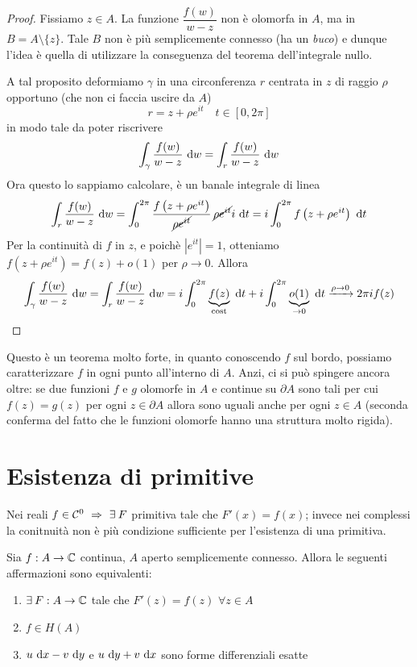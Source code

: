 \begin{proof}
Fissiamo $z\in A$. La funzione $\dfrac{f(w)}{w - z}$ non è olomorfa in $A$, ma in $B=A\setminus\{z\}$. Tale $B$ non è più semplicemente connesso (ha un \textit{buco}) e dunque l'idea è quella di utilizzare la conseguenza del teorema dell'integrale nullo.

A tal proposito deformiamo $\gamma$ in una circonferenza $r$ centrata in $z$ di raggio $\rho$ opportuno (che non ci faccia uscire da $A$)
$$
r=z+\rho e^{it} \quad t\in[0,2\pi]
$$
in modo tale da poter riscrivere
\begin{equation*}
\int_{\gamma}\frac{f(w)}{w - z} \  \mathrm{d} w=\int_{r}\frac{f(w)}{w - z} \  \mathrm{d} w
\end{equation*}
Ora questo lo sappiamo calcolare, è un banale integrale di linea
\begin{equation*}
\int_{r}\frac{f(w)}{w - z} \  \mathrm{d} w = \int^{2\pi}_{0}\frac{f\left(z + \rho e^{it}\right)}{\cancel{\rho e^{it}}}\,\cancel{\rho e^{it}}i \  \mathrm{d} t = i\int^{2\pi}_{0} f\left(z + \rho e^{it}\right) \  \mathrm{d} t
\end{equation*}
Per la continuità di $f$ in $z$, e poichè $\left|e^{it}\right|=1$, otteniamo $f\left(z + \rho e^{it}\right)=f(z)+o(1)$ per $\rho\to 0$. Allora
\begin{equation*}
\int_{\gamma}\frac{f(w)}{w - z} \  \mathrm{d} w=\int_{r}\frac{f(w)}{w - z} \  \mathrm{d} w=i\int_{0}^{2\pi} \underbrace{f(z)}_{\text{cost}}\  \mathrm{d} t+i\int_0^{2\pi} \underbrace{o(1)}_{\to 0}\  \mathrm{d} t \xrightarrow[]{\rho\to 0} 2\pi i f(z)
\end{equation*}
\end{proof}

Questo è un teorema molto forte, in quanto conoscendo $f$ sul bordo, possiamo caratterizzare $f$ in ogni punto all'interno di $A$. Anzi, ci si può spingere ancora oltre: se due funzioni $f$ e $g$ olomorfe in $A$ e continue su $\partial A$ sono tali per cui $f(z)=g(z)$ per ogni $z\in\partial A$ allora sono uguali anche per ogni $z\in A$ (seconda conferma del fatto che le funzioni olomorfe hanno una struttura molto rigida).

\section{Esistenza di primitive}

Nei reali $f\in\Cc^0\ \Rightarrow\ \exists F$ primitiva tale che $F'(x)=f(x)$; invece nei complessi la conitnuità non è più condizione sufficiente per l'esistenza di una primitiva.
\begin{thm}
Sia $f:A\to\mathbb{C}$ continua, $A$ aperto semplicemente connesso. Allora le seguenti affermazioni sono equivalenti:
\begin{enumerate}
    \item $\exists F:A\to\CC$ tale che $F'(z)=f(z)$ $\forall z\in A$
    \item $f\in H(A)$
    \item $u\  \mathrm{d} x-v\  \mathrm{d} y$ e $u\  \mathrm{d} y+v\  \mathrm{d} x$ sono forme differenziali esatte
\end{enumerate}
\end{thm}


